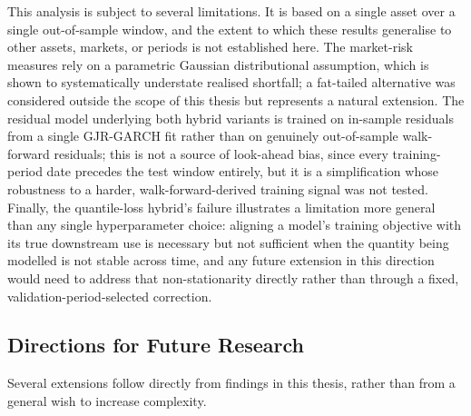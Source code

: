 \documentclass[12pt,a4paper]{article}
\begin{document}
This analysis is subject to several limitations. It is based on a single asset over a single
out-of-sample window, and the extent to which these results generalise to other assets, markets, or
periods is not established here. The market-risk measures rely on a parametric Gaussian
distributional assumption, which is shown to systematically understate realised shortfall; a
fat-tailed alternative was considered outside the scope of this thesis but represents a natural
extension. The residual model underlying both hybrid variants is trained on in-sample residuals from
a single GJR-GARCH fit rather than on genuinely out-of-sample walk-forward residuals; this is not a
source of look-ahead bias, since every training-period date precedes the test window entirely, but
it is a simplification whose robustness to a harder, walk-forward-derived training signal was not
tested. Finally, the quantile-loss hybrid's failure illustrates a limitation more general than any
single hyperparameter choice: aligning a model's training objective with its true downstream use is
necessary but not sufficient when the quantity being modelled is not stable across time, and any
future extension in this direction would need to address that non-stationarity directly rather than
through a fixed, validation-period-selected correction.

\subsection{Directions for Future Research}
Several extensions follow directly from findings in this thesis, rather than from a general
wish to increase complexity.
\end{document}
